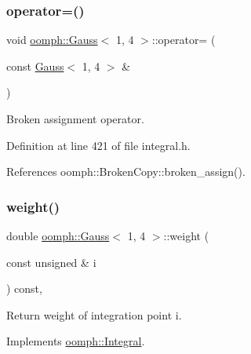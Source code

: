 \mbox{\label{classoomph_1_1Gauss_3_011_00_014_01_4_ad3cfca76fefa1ecde1b1248ab9bde15e}} 
\subsubsection{\texorpdfstring{operator=()}{operator=()}}
{\footnotesize\ttfamily void \hyperlink{classoomph_1_1Gauss}{oomph\+::\+Gauss}$<$ 1, 4 $>$\+::operator= (\begin{DoxyParamCaption}\item[{const \hyperlink{classoomph_1_1Gauss}{Gauss}$<$ 1, 4 $>$ \&}]{ }\end{DoxyParamCaption})\hspace{0.3cm}{\ttfamily [inline]}}



Broken assignment operator. 



Definition at line 421 of file integral.\+h.



References oomph\+::\+Broken\+Copy\+::broken\+\_\+assign().

\mbox{\label{classoomph_1_1Gauss_3_011_00_014_01_4_a528ff3a23fb367ead8a5088142fb8828}} 
\subsubsection{\texorpdfstring{weight()}{weight()}}
{\footnotesize\ttfamily double \hyperlink{classoomph_1_1Gauss}{oomph\+::\+Gauss}$<$ 1, 4 $>$\+::weight (\begin{DoxyParamCaption}\item[{const unsigned \&}]{i }\end{DoxyParamCaption}) const\hspace{0.3cm}{\ttfamily [inline]}, {\ttfamily [virtual]}}



Return weight of integration point i. 



Implements \hyperlink{classoomph_1_1Integral_ac65335e2aab120b285b3d6c294507b06}{oomph\+::\+Integral}.



